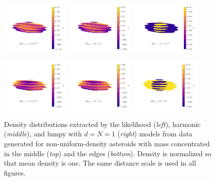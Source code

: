 \documentclass[fleqn,usenatbib]{mnras}
\begin{document}
\begin{figure}
  \centering
  \includegraphics[width=0.3\textwidth]{figs/in-likelihood.pdf}\hfill
  \includegraphics[width=0.3\textwidth]{figs/in-harmonic.pdf}\hfill
  \includegraphics[width=0.3\textwidth]{figs/in-lumpy.pdf}

  \includegraphics[width=0.3\textwidth]{figs/out-likelihood.pdf}\hfill
  \includegraphics[width=0.3\textwidth]{figs/out-harmonic.pdf}\hfill
  \includegraphics[width=0.3\textwidth]{figs/out-lumpy.pdf}\

  \caption{Density distributions extracted by the likelihood (\textit{left}), harmonic (\textit{middle}), and lumpy with $d=N=1$ (\textit{right}) models from data generated for non-uniform-density asteroids with mass concentrated in the middle (\textit{top}) and the edges (\textit{bottom}). Density is normalized so that mean density is one. The same distance scale is used in all figures.}
  \label{fig:non-uniform-density}
\end{figure}
\end{document}
